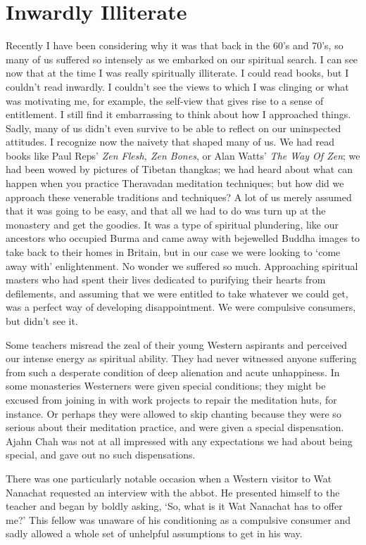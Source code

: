 \section{Inwardly Illiterate}

Recently I have been considering why it was that back in the 60’s and
70’s, so many of us suffered so intensely as we embarked on our
spiritual search. I can see now that at the time I was really
spiritually illiterate. I could read books, but I couldn’t read
inwardly. I couldn’t see the views to which I was clinging or what was
motivating me, for example, the self-view that gives rise to a sense of
entitlement. I still find it embarrassing to think about how I
approached things. Sadly, many of us didn’t even survive to be able to
reflect on our uninspected attitudes. I recognize now the naivety that
shaped many of us. We had read books like Paul Reps' \emph{Zen Flesh, Zen
Bones}, or Alan Watts' \emph{The Way Of Zen}; we had been wowed by pictures
of Tibetan thangkas; we had heard about what can happen when you practice
Theravadan meditation techniques; but how did we approach these
venerable traditions and techniques? A lot of us merely assumed that it
was going to be easy, and that all we had to do was turn up at the
monastery and get the goodies. It was a type of spiritual plundering,
like our ancestors who occupied Burma and came away with bejewelled
Buddha images to take back to their homes in Britain, but in our case we
were looking to ‘come away with’ enlightenment. No wonder we suffered so
much. Approaching spiritual masters who had spent their lives dedicated
to purifying their hearts from defilements, and assuming that we were
entitled to take whatever we could get, was a perfect way of developing
disappointment. We were compulsive consumers, but didn’t see it.

Some teachers misread the zeal of their young Western aspirants and
perceived our intense energy as spiritual ability. They had never
witnessed anyone suffering from such a desperate condition of deep
alienation and acute unhappiness. In some monasteries Westerners were
given special conditions; they might be excused from joining in with
work projects to repair the meditation huts, for instance. Or perhaps
they were allowed to skip chanting because they were so serious about
their meditation practice, and were given a special dispensation. Ajahn
Chah was not at all impressed with any expectations we had about being
special, and gave out no such dispensations.

There was one particularly notable occasion when a Western visitor to
Wat Nanachat requested an interview with the abbot. He presented himself
to the teacher and began by boldly asking, ‘So, what is it Wat Nanachat
has to offer me?’ This fellow was unaware of his conditioning as a
compulsive consumer and sadly allowed a whole set of unhelpful
assumptions to get in his way.

